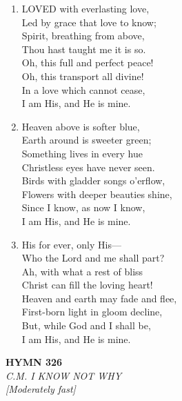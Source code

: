 \documentclass[11pt,a4paper]{article}
\begin{document}
\begin{enumerate}
    \item LOVED with everlasting love, \\
        Led by grace that love to know; \\
        Spirit, breathing from above, \\
        Thou hast taught me it is so. \\
        Oh, this full and perfect peace! \\
        Oh, this transport all divine! \\
        In a love which cannot cease, \\
        I am His, and He is mine.

    \item Heaven above is softer blue, \\
        Earth around is sweeter green; \\
        Something lives in every hue \\
        Christless eyes have never seen. \\
        Birds with gladder songs o'erflow, \\
        Flowers with deeper beauties shine, \\
        Since I know, as now I know, \\
        I am His, and He is mine.

    \item His for ever, only His--- \\
        Who the Lord and me shall part? \\
        Ah, with what a rest of bliss \\
        Christ can fill the loving heart! \\
        Heaven and earth may fade and flee, \\
        First-born light in gloom decline, \\
        But, while God and I shall be, \\
        I am His, and He is mine.

\end{enumerate}

\newpage
\begin{center}
    {\Large \textbf{HYMN 326}}
    \\
    \textit{C.M. I KNOW NOT WHY}
    \\
    \textit{\small [Moderately fast]}
\end{center}
\vspace{1em}
\end{document}
